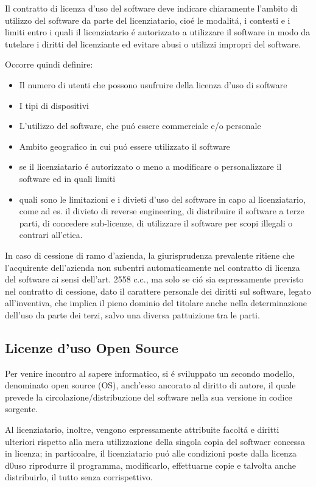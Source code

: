 \documentclass{article}
\begin{document}
Il contratto di licenza d'uso del software deve indicare chiaramente l'ambito di utilizzo del software da parte del licenziatario, cio\'e le modalit\'a, i contesti e i limiti entro i quali il licenziatario \'e autorizzato a utilizzare il software in modo da tutelare i diritti del licenziante ed evitare abusi o utilizzi impropri del software.

Occorre quindi definire:
\begin{itemize}
    \item Il numero di utenti che possono usufruire della licenza d'uso di software
    \item I tipi di dispositivi
    \item L'utilizzo del software, che pu\'o essere commerciale e/o personale
    \item Ambito geografico in cui pu\'o essere utilizzato il software
    \item se il licenziatario \'e autorizzato o meno a modificare o personalizzare il software ed in quali limiti
    \item quali sono le limitazioni e i divieti d'uso del software in capo al licenziatario, come ad es. il divieto di reverse engineering, di distribuire il software a terze parti, di concedere sub-licenze, di utilizzare il software per scopi illegali o contrari all'etica.
\end{itemize}

In caso di cessione di ramo d'azienda, la giurisprudenza prevalente ritiene che l'acquirente dell'azienda non subentri automaticamente nel contratto di licenza del software ai sensi dell'art. 2558 c.c., ma solo se ci\'o sia espressamente previsto nel contratto di cessione, dato il carattere personale dei diritti sul software, legato all'inventiva, che implica il pieno dominio del titolare anche nella determinazione dell'uso da parte dei terzi, salvo una diversa pattuizione tra le parti.

\subsection{Licenze d'uso Open Source}
Per venire incontro al sapere informatico, si \'e sviluppato un secondo modello, denominato open source (OS), anch'esso ancorato al diritto di autore, il quale prevede la circolazione/distribuzione del software nella sua versione in codice sorgente. 

Al licenziatario, inoltre, vengono espressamente attribuite facolt\'a e diritti ulteriori rispetto alla mera utilizzazione della singola copia del softwaer concessa in licenza; in particoalre, il licenziatario pu\'o alle condizioni poste dalla licenza d0uso riprodurre il programma, modificarlo, effettuarne copie e talvolta anche distribuirlo, il tutto senza corrispettivo. 
\end{document}
